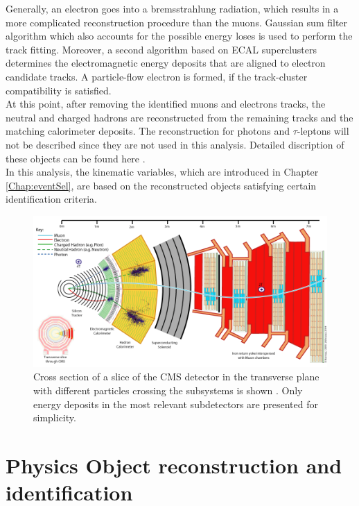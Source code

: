 Generally, an electron goes into a bremsstrahlung radiation, which results in a more complicated reconstruction procedure than the muons. Gaussian sum filter \cite{GSF} algorithm which also accounts for the possible energy loses is used to perform the track fitting. Moreover, a second algorithm based on ECAL superclusters determines the electromagnetic energy deposits that are aligned to electron candidate tracks. A particle-flow electron is formed, if the track-cluster compatibility is satisfied.\\
At this point, after removing the identified muons and electrons tracks, the neutral and charged hadrons are reconstructed from the remaining tracks and the matching calorimeter deposits. The reconstruction for photons and $\tau$-leptons will not be described since they are not used in this analysis. Detailed discription of these objects can be found here \cite{Photon1}. \\
In this analysis, the kinematic variables, which are introduced in Chapter \ref{Chap:eventSel}, are based on the reconstructed objects satisfying certain identification criteria.
\begin{figure}
\begin{center}
\includegraphics[width=\textwidth]{Plots/CMS/CMS_Slice}
\caption{\label{fig:CMS_Slice} Cross section of a slice of the CMS detector in the transverse plane with different particles crossing the subsystems is shown \cite{CMS_slice}. Only energy deposits in the most relevant subdetectors are presented for simplicity.}
\end{center}
\end{figure}
\section{Physics Object reconstruction and identification}
